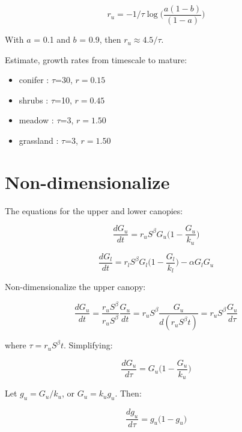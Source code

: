 \documentclass{article}
\begin{document}
\begin{equation}
r_u =   - 1/ \tau \log \big(\frac{a (1-b) }{(1- a )}\big)
\end{equation}


With $a$ = 0.1 and $b$ = 0.9, then $r_u \approx 4.5/ \tau$.

Estimate, growth rates from timescale to mature:

\begin{itemize}
\item conifer : $\tau$=30, $r=0.15$
\item shrubs : $\tau$=10, $r=0.45$
\item meadow : $\tau$=3, $r=1.50$
\item grassland : $\tau$=3, $r=1.50$
\end{itemize}


\section{Non-dimensionalize}

The equations for the upper and lower canopies:

\begin{equation*}
	 \frac{d G_u}{dt} =
	 r_u S^\beta G_u \bigg(1-\frac{G_u}{k_u}\bigg)
\end{equation*}


\begin{equation*}
	 \frac{d G_l}{dt} = r_l S^\beta G_l \bigg(1-\frac{G_l}{k_l}\bigg) - \alpha G_l G_u
\end{equation*}

Non-dimensionalize the upper canopy:

\begin{equation*}
    \frac{d G_u}{dt} =
     \frac{r_u S^\beta}{r_u S^\beta} \frac{G_u}{dt} =
  	{r_u S^\beta} \frac{G_u}{d(r_u S^\beta t)} =
	r_u S^\beta \frac{G_u}{d \tau}
\end{equation*}

where $\tau = r_u S^\beta t$.  Simplifying:

\begin{equation*}
    \frac{d G_u}{d\tau} =
    G_u \bigg(1-\frac{G_u}{k_u}\bigg)
\end{equation*}


Let  $g_u = G_u/k_u$, or   $G_u =   k_u g_u$.  Then:

\begin{equation*}
  \frac{d   g_u}{d\tau} =
	 g_u \bigg(1 -  g_u \bigg)
\end{equation*}
\end{document}

